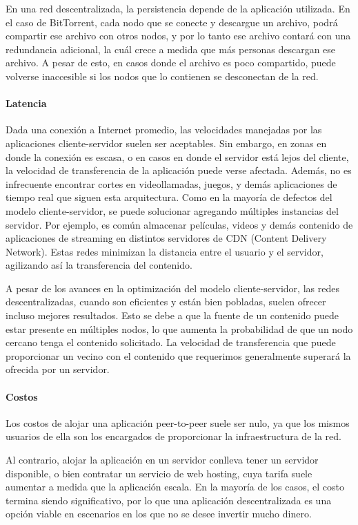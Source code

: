 En una red descentralizada, la persistencia depende de la aplicación utilizada. En el caso de BitTorrent, cada nodo que se conecte y descargue un archivo, podrá compartir ese archivo con otros nodos, y por lo tanto ese archivo contará con una redundancia adicional, la cuál crece a medida que más personas descargan ese archivo. A pesar de esto, en casos donde el archivo es poco compartido, puede volverse inaccesible si los nodos que lo contienen se desconectan de la red.

\paragraph{Latencia}
Dada una conexión a Internet promedio, las velocidades manejadas por las aplicaciones cliente-servidor suelen ser aceptables. Sin embargo, en zonas en donde la conexión es escasa, o en casos en donde el servidor está lejos del cliente, la velocidad de transferencia de la aplicación puede verse afectada. Además, no es infrecuente encontrar cortes en videollamadas, juegos, y demás aplicaciones de tiempo real que siguen esta arquitectura. Como en la mayoría de defectos del modelo cliente-servidor, se puede solucionar agregando múltiples instancias del servidor. Por ejemplo, es común almacenar  películas, videos y demás contenido de aplicaciones de streaming en distintos servidores de CDN (Content Delivery Network). Estas redes minimizan la distancia entre el usuario y el servidor, agilizando así la transferencia del contenido.

A pesar de los avances en la optimización del modelo cliente-servidor, las redes descentralizadas, cuando son eficientes y están bien pobladas, suelen ofrecer incluso mejores resultados. Esto se debe a que la fuente de un contenido puede estar presente en múltiples nodos, lo que aumenta la probabilidad de que un nodo cercano tenga el contenido solicitado. La velocidad de transferencia que puede proporcionar un vecino con el contenido que requerimos generalmente superará la ofrecida por un servidor.

\paragraph{Costos}
Los costos de alojar una aplicación peer-to-peer suele ser nulo, ya que los mismos usuarios de ella son los encargados de proporcionar la infraestructura de la red.

Al contrario, alojar la aplicación en un servidor conlleva tener un servidor disponible, o bien contratar un servicio de web hosting, cuya tarifa suele aumentar a medida que la aplicación escala. En la mayoría de los casos, el costo termina siendo significativo, por lo que una aplicación descentralizada es una opción viable en escenarios en los que no se desee invertir mucho dinero.

